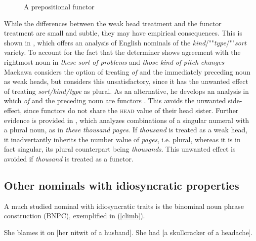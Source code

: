 \documentclass[output=paper
                ,modfonts
                ,nonflat
	        ,collection
	        ,collectionchapter
	        ,collectiontoclongg
 	        ,biblatex
                ,babelshorthands
                ,newtxmath
                ,draftmode
                ,colorlinks, citecolor=brown
]{./langsci/langscibook}
\begin{document}
\begin{figure}
	\centering
{}
	\caption{\label{beau} A prepositional functor}
\end{figure}

While the differences between the weak head treatment and the functor treatment are small and subtle, 
they may have empirical consequences. This is shown in \citet{Maekawa15}, which offers 
an analysis of English nominals of the \emph{kind}/""\emph{type}/""\emph{sort} variety.  
To account for the fact that the determiner shows agreement with the 
rightmost noun in \emph{these sort of problems} and \emph{those kind of pitch changes}
Maekawa considers the option of treating \emph{of} and the immediately preceding noun as 
weak heads, but considers this unsatisfactory, since it has the unwanted effect of treating 
\emph{sort/kind/type} as plural. As an alternative, he develops an analysis in which \emph{of} and 
the preceding noun are functors \citep[149]{Maekawa15}. This avoids the unwanted side-effect, 
since functors do not share the \textsc{head} value of their head sister. 
Further evidence is provided in \citet{Maekawa16}, which analyzes combinations of a   
singular numeral with a plural noun, as in \emph{these thousand pages}. If 
\emph{thousand} is treated as a weak head, it inadvertantly inherits the number value of
\emph{pages}, i.e. plural, whereas it is in fact singular, its plural counterpart being 
\emph{thousands}. This unwanted effect is avoided if \emph{thousand} is treated as a functor.


\subsection{Other nominals with idiosyncratic properties} 


A much studied nominal with idiosyncratic traits is the binominal noun phrase 
construction (BNPC), exemplified in (\ref{climb}). 

\begin{exe}
\ex\label{climb}
\begin{xlist}
\ex  She blames it on [her nitwit of a husband]. 
\ex  She had [a skullcracker of a headache]. 
\end{xlist}
\end{exe}
\end{document}
